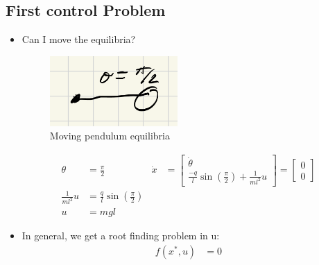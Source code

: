 \documentclass[11pt]{article}
\begin{document}
\subsection{First control Problem}
\begin{itemize}
    \item Can I move the equilibria?
    \begin{figure}[H]
        \centering
        \includegraphics[width=0.4\linewidth]{lecture_2_2.png}
        \caption{Moving pendulum equilibria}
        \label{pendulum2}
    \end{figure}
    \begin{align*}
        \theta &= \frac{\pi}{2} & \dot{x} &= \begin{bmatrix}
            \dot{\theta} \\
            \frac{-q}{l}\sin\left(\frac{\pi}{2}\right) + \frac{1}{ml^2}u
        \end{bmatrix}
        =
        \begin{bmatrix}
            0 \\
            0
        \end{bmatrix}
        \\
        \frac{1}{ml^2}u &= \frac{q}{l}\sin\left(\frac{\pi}{2}\right)
        \\
        u &= mgl
    \end{align*}
    \item In general, we get a root finding problem in u:
    \begin{align*}
        f(x^*,u) &= 0
    \end{align*}
\end{itemize}
\end{document}
